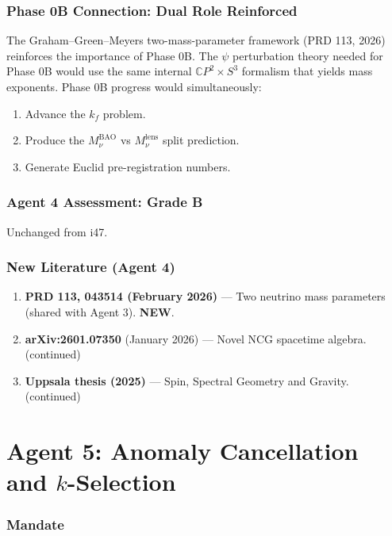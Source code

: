 \documentclass[11pt,a4paper]{article}
\newcommand{\NEW}{\textcolor{dfdblue}{\textbf{NEW}}}
\newcommand{\CP}{\mathbb{C}P}
\begin{document}
\section{Phase 0B Connection: Dual Role Reinforced}

The Graham--Green--Meyers two-mass-parameter framework (PRD 113, 2026) reinforces the importance of Phase 0B. The $\psi$ perturbation theory needed for Phase 0B would use the same internal $\CP^2 \times S^3$ formalism that yields mass exponents. Phase 0B progress would simultaneously:
\begin{enumerate}
\item Advance the $k_f$ problem.
\item Produce the $M_\nu^{\text{BAO}}$ vs $M_\nu^{\text{lens}}$ split prediction.
\item Generate Euclid pre-registration numbers.
\end{enumerate}

\section{Agent 4 Assessment: Grade B}

Unchanged from i47.

\section{New Literature (Agent 4)}

\begin{enumerate}
\item \textbf{PRD 113, 043514 (February 2026)} --- Two neutrino mass parameters (shared with Agent 3). \NEW.
\item \textbf{arXiv:2601.07350} (January 2026) --- Novel NCG spacetime algebra. (continued)
\item \textbf{Uppsala thesis (2025)} --- Spin, Spectral Geometry and Gravity. (continued)
\end{enumerate}


\part{Agent 5: Anomaly Cancellation and $k$-Selection}
\label{part:agent5}

\section{Mandate}
\end{document}
